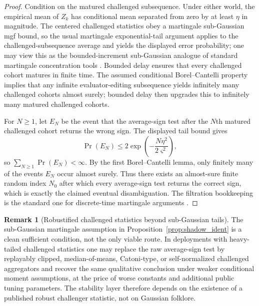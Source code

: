 \documentclass[11pt]{article}
\theoremstyle{definition}
\newtheorem{remark}[theorem]{Remark}
\newcommand{\1}{\mathbf{1}}
\begin{document}
\begin{proof}
Condition on the matured challenged subsequence. Under either world, the empirical mean of $Z_k$ has conditional mean separated from zero by at least $\eta$ in magnitude. The centered challenged statistics obey a martingale sub-Gaussian mgf bound, so the usual martingale exponential-tail argument applies to the challenged-subsequence average and yields the displayed error probability; one may view this as the bounded-increment sub-Gaussian analogue of standard martingale concentration tools \cite{Freedman1975}. Bounded delay ensures that every challenged cohort matures in finite time. The assumed conditional Borel--Cantelli property implies that any infinite evaluator-editing subsequence yields infinitely many challenged cohorts almost surely; bounded delay then upgrades this to infinitely many matured challenged cohorts.

For $N\ge 1$, let $E_N$ be the event that the average-sign test after the $N$th matured challenged cohort returns the wrong sign. The displayed tail bound gives
\[
\Pr(E_N)\le 2\exp\!\left(-\frac{N\eta^2}{2\varsigma^2}\right),
\]
so $\sum_{N\ge 1}\Pr(E_N)<\infty$. By the first Borel--Cantelli lemma, only finitely many of the events $E_N$ occur almost surely. Thus there exists an almost-sure finite random index $N_0$ after which every average-sign test returns the correct sign, which is exactly the claimed eventual disambiguation. The filtration bookkeeping is the standard one for discrete-time martingale arguments \cite{Williams1991}.
\end{proof}

\begin{remark}[Robustified challenged statistics beyond sub-Gaussian tails]
The sub-Gaussian martingale assumption in Proposition~\ref{prop:shadow_ident} is a clean sufficient condition, not the only viable route. In deployments with heavy-tailed challenged statistics one may replace the raw average-sign test by replayably clipped, median-of-means, Catoni-type, or self-normalized challenged aggregators and recover the same qualitative conclusion under weaker conditional moment assumptions, at the price of worse constants and additional public tuning parameters. The stability layer therefore depends on the existence of a published robust challenger statistic, not on Gaussian folklore.
\end{remark}
\end{document}
